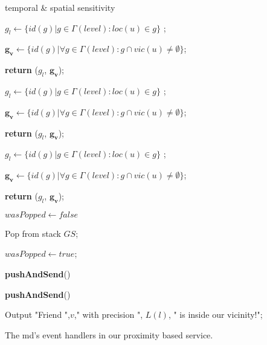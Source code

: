 \begin{algorithm}[!Hbt]
    \dontprintsemicolon
    \SetVline




    {
	temporal \& spatial sensitivity
	}

	$g_l \leftarrow \{id(g) | g \in \Gamma(level): loc(u) \in g\}$ ;

	$\mathbf{g_v} \leftarrow \{id(g) | \forall g \in \Gamma(level): g
\cap vic(u) \neq \emptyset\}$;

	\textbf{return} ($g_l$, $\mathbf{g_v}$);
% 
    {
	$g_l \leftarrow \{id(g) | g \in \Gamma(level): loc(u) \in g\}$ ;

	$\mathbf{g_v} \leftarrow \{id(g) | \forall g \in \Gamma(level): g
\cap vic(u) \neq \emptyset\}$;

	\textbf{return} ($g_l$, $\mathbf{g_v}$);
    }
% 
    {
	$g_l \leftarrow \{id(g) | g \in \Gamma(level): loc(u) \in g\}$ ;

	$\mathbf{g_v} \leftarrow \{id(g) | \forall g \in \Gamma(level): g
\cap vic(u) \neq \emptyset\}$;

	\textbf{return} ($g_l$, $\mathbf{g_v}$);
    }


    {
        $wasPopped \leftarrow false$

        {
            Pop from stack $GS$;

            $wasPopped \leftarrow true$;
        }

        {
            \textbf{pushAndSend}()
        }
    }

    {
        {
            \textbf{pushAndSend}()
        }
     }

    {
        Output "Friend ",$v$," with precision ", $L(l)$, " is inside
our vicinity!";
    }

\caption{The md's event handlers in our proximity based service.} 
\label{algCl}
\end{algorithm}